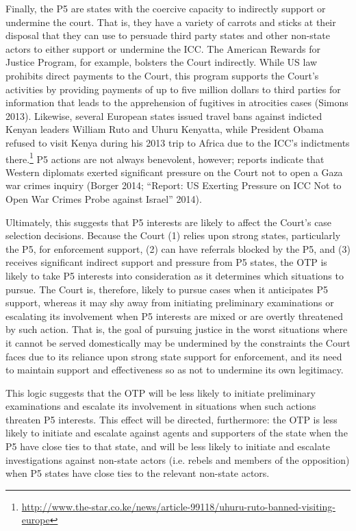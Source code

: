 Finally, the P5 are states with the coercive capacity to indirectly support or undermine the court. That is, they have a variety of carrots and sticks at their disposal that they can use to persuade third party states and other non-state actors to either support or undermine the ICC. The American Rewards for Justice Program, for example, bolsters the Court indirectly. While US law prohibits direct payments to the Court, this program supports the Court's activities by providing payments of up to five million dollars to third parties for information that leads to the apprehension of fugitives in atrocities cases (Simons 2013).  Likewise, several European states issued travel bans against indicted Kenyan leaders William Ruto and Uhuru Kenyatta, while President Obama refused to visit Kenya during his 2013 trip to Africa due to the ICC's indictments there.\footnote{\url{http://www.the-star.co.ke/news/article-99118/uhuru-ruto-banned-visiting-europe}} P5 actions are not always benevolent, however; reports indicate that Western diplomats exerted significant pressure on the Court not to open a Gaza war crimes inquiry (Borger 2014; ``Report: US Exerting Pressure on ICC Not to Open War Crimes Probe against Israel'' 2014). 

Ultimately, this suggests that P5 interests are likely to affect the Court's case selection decisions. Because the Court (1) relies upon strong states, particularly the P5, for enforcement support, (2) can have referrals blocked by the P5, and (3) receives significant indirect support and pressure from P5 states, the OTP is likely to take P5 interests into consideration as it determines which situations to pursue. The Court is, therefore, likely to pursue cases when it anticipates P5 support, whereas it may shy away from initiating preliminary examinations or escalating its involvement when P5 interests are mixed or are overtly threatened by such action. That is, the goal of pursuing justice in the worst situations where it cannot be served domestically may be undermined by the constraints the Court faces due to its reliance upon strong state support for enforcement, and its need to maintain support and effectiveness so as not to undermine its own legitimacy.

This logic suggests that the OTP will be less likely to initiate preliminary examinations and escalate its involvement in situations when such actions threaten P5 interests. This effect will be directed, furthermore: the OTP is less likely to initiate and escalate against agents and supporters of the state when the P5 have close ties to that state, and will be less likely to initiate and escalate investigations against non-state actors (i.e. rebels and members of the opposition) when P5 states have close ties to the relevant non-state actors. 

